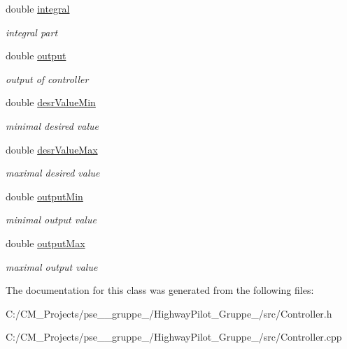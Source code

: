 \begin{DoxyCompactItemize}
double \mbox{\hyperlink{class_controller_ad3426386f22bdf2e1781a27cfd87d1f8}{integral}}
\begin{DoxyCompactList}\small\item\em integral part \end{DoxyCompactList}\item 
\mbox{\label{class_controller_af200ab6d3befeb67339074a9e1bc3a84}} 
double \mbox{\hyperlink{class_controller_af200ab6d3befeb67339074a9e1bc3a84}{output}}
\begin{DoxyCompactList}\small\item\em output of controller \end{DoxyCompactList}\item 
\mbox{\label{class_controller_aba1de8e0e112e081ed9f64ab8454fdf6}} 
double \mbox{\hyperlink{class_controller_aba1de8e0e112e081ed9f64ab8454fdf6}{desr\+Value\+Min}}
\begin{DoxyCompactList}\small\item\em minimal desired value \end{DoxyCompactList}\item 
\mbox{\label{class_controller_ab77e59e477d4deab4b46f35ea7c5506c}} 
double \mbox{\hyperlink{class_controller_ab77e59e477d4deab4b46f35ea7c5506c}{desr\+Value\+Max}}
\begin{DoxyCompactList}\small\item\em maximal desired value \end{DoxyCompactList}\item 
\mbox{\label{class_controller_a2ef60beca63b2f987bbee1c506c99ee6}} 
double \mbox{\hyperlink{class_controller_a2ef60beca63b2f987bbee1c506c99ee6}{output\+Min}}
\begin{DoxyCompactList}\small\item\em minimal output value \end{DoxyCompactList}\item 
\mbox{\label{class_controller_a7a95bc4b00cb87c4fb7547876fc30adf}} 
double \mbox{\hyperlink{class_controller_a7a95bc4b00cb87c4fb7547876fc30adf}{output\+Max}}
\begin{DoxyCompactList}\small\item\em maximal output value \end{DoxyCompactList}\end{DoxyCompactItemize}


The documentation for this class was generated from the following files\+:\begin{DoxyCompactItemize}
\item 
C\+:/\+C\+M\+\_\+\+Projects/pse\+\_\+\_\+gruppe\+\_/\+Highway\+Pilot\+\_\+\+Gruppe\+\_/src/Controller.\+h\item 
C\+:/\+C\+M\+\_\+\+Projects/pse\+\_\+\_\+gruppe\+\_/\+Highway\+Pilot\+\_\+\+Gruppe\+\_/src/Controller.\+cpp\end{DoxyCompactItemize}
